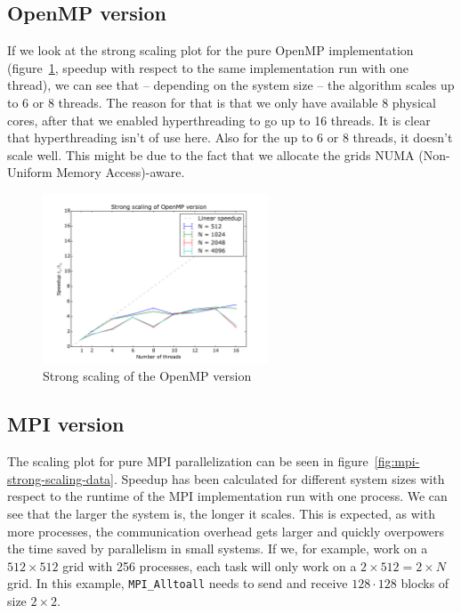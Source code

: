 \documentclass[a4paper]{article}
\begin{document}
\subsection{OpenMP version}

If we look at the strong scaling plot for the pure OpenMP implementation (figure~\ref{fig:omp-strong-scaling}, speedup with respect to the same implementation run with one thread), we can see that -- depending on the system size -- the algorithm scales up to 6 or 8 threads.
The reason for that is that we only have available 8 physical cores, after that we enabled hyperthreading to go up to 16 threads.
It is clear that hyperthreading isn't of use here.
Also for the up to 6 or 8 threads, it doesn't scale well.
This might be due to the fact that we allocate the grids NUMA (Non-Uniform Memory Access)-aware.
\begin{figure}
	\centering
	\includegraphics[width=0.6\textwidth]{omp_strong_scaling.pdf}
	\caption{Strong scaling of the OpenMP version}
	\label{fig:omp-strong-scaling}
\end{figure}



\subsection{MPI version}\label{sec:mpi-scaling}
The scaling plot for pure MPI parallelization can be seen in figure~\ref{fig:mpi-strong-scaling-data}.
Speedup has been calculated for different system sizes with respect to the runtime of the MPI implementation run with one process.
We can see that the larger the system is, the longer it scales.
This is expected, as with more processes, the communication overhead gets larger and quickly overpowers the time saved by parallelism in small systems.
If we, for example, work on a $512 \times 512$ grid with 256 processes, each task will only work on a $2 \times 512 = 2 \times N$ grid.
In this example, \verb|MPI_Alltoall| needs to send and receive $128 \cdot 128$ blocks of size $2 \times 2$.
\end{document}
